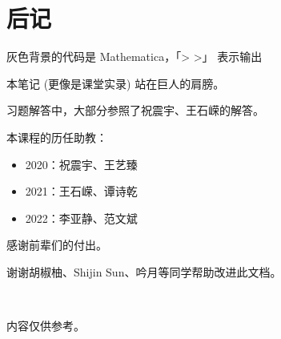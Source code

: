 \section{后记}

灰色背景的代码是 Mathematica，「> >」 表示输出

本笔记 (更像是课堂实录) 站在巨人的肩膀。

习题解答中，大部分参照了祝震宇、王石嵘的解答。

本课程的历任助教：
\begin{itemize}
    \item 2020：祝震宇、王艺臻
    \item 2021：王石嵘、谭诗乾
    \item 2022：李亚静、范文斌
\end{itemize}

感谢前辈们的付出。

谢谢胡椒柚、Shijin Sun、吟月等同学帮助改进此文档。

~

内容仅供参考。
